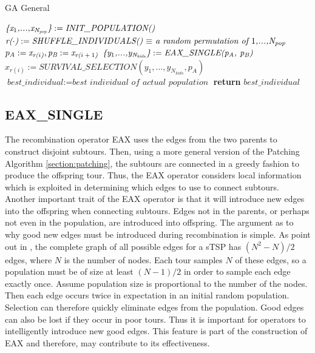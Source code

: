\begin{algorithm}
\caption{GA General}\label{alg:gagen}
\begin{algorithmic}[1]
\State $\textit{\{x\textsubscript{$1$},...,x\textsubscript{N\textsubscript{pop}}\}} := \textit{INIT\_POPULATION()}$
	\State $\textit{r($\cdot$)} := \textit{SHUFFLE\_INDIVIDUALS() $\equiv$ a random permutation of $1$,...,N\textsubscript{pop} } $
		\State $p_A := \textit{x\textsubscript{r($i$)}} , \textit{p\textsubscript{B}} := \textit{x\textsubscript{r($i+1$)}} $
		\State $\textit{\{y\textsubscript{$1$},...,y\textsubscript{N\textsubscript{kids}}\}} := \textit{EAX\_SINGLE(p\textsubscript{A}, p\textsubscript{B})}$
		\State $x_{r(i)} := SURVIVAL\_SELECTION(y_1,...,y_{N_{kids}}, p_A) $
	\EndFor
	\State $\textit{best\_individual} := \textit{best individual of actual population}$
\EndWhile
\State \textbf{return} $best\_individual$
\EndProcedure
\end{algorithmic}
\end{algorithm}

\subsection{EAX\_SINGLE}
The recombination operator EAX uses the edges from the two parents to construct disjoint subtours.
Then, using a more general version of the Patching Algorithm \ref{section:patching}, the subtours are connected in a greedy fashion to produce the offspring tour. Thus, the EAX operator considers local information which is exploited in determining which edges to use to connect subtours.\\
Another important trait of the EAX operator is that it will introduce new edges into the offspring when connecting subtours. Edges not in the parents, or perhaps not even in the population, are introduced into offspring. 
The argument as to why good new edges must be introduced during recombination is simple. As point out in \cite{Mathias92geneticoperators}, the complete graph of all possible edges for a sTSP has $(N^2-N)/2$ edges, where $N$ is the number of nodes. Each tour samples $N$ of these edges, so a population must be of size at least $(N-1)/2$ in order to sample each edge exactly once. Assume population size is proportional to the number of the nodes. Then each edge occurs twice in expectation in an initial random population. Selection can therefore quickly eliminate edges from the population. Good edges can also be lost if they occur in poor tours. Thus it is important for operators to intelligently introduce new good edges. This feature is part of the construction of EAX and therefore, may contribute to its effectiveness.\\

